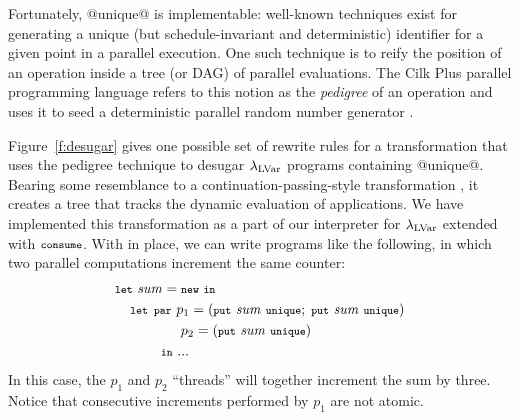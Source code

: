 Fortunately, @unique@ is implementable: well-known techniques exist for generating a unique (but
schedule-invariant and deterministic) identifier for a given point in
a parallel execution.
One such technique is to reify the position of an
operation inside a tree (or DAG) of parallel evaluations.  
The Cilk Plus parallel programming language 
refers to this notion as the {\em pedigree} of an operation and uses it to seed a
deterministic parallel random number generator \cite{cilk-dprng}.

Figure~\ref{f:desugar} gives one possible set of rewrite rules for a transformation that uses the pedigree technique to desugar $\textup{\ensuremath{\lambda_{\textrm{LVar}}}}$ programs containing @unique@.  Bearing some resemblance to a continuation-passing-style transformation \cite{cps-citation}, it 
creates a tree that tracks the dynamic evaluation of
applications.
We have implemented this transformation as a part of our 
interpreter for $\textup{\ensuremath{\lambda_{\textrm{LVar}}}}$ extended with $\mbox{\footnotesize \texttt{consume}}$.
With  in place, we can write programs like the following, in which two
parallel
computations increment the same counter:
\begin{equation*}
\begin{split}
& \letexp{\mathit{sum}}{\NEW}{ \\
& \letspace \LETPAR      ~p_1 = (\putexp{\mathit{sum}}{\impfnt{unique}};\; \putexp{\mathit{sum}}{\impfnt{unique}})\\
& \letspace \letparspace ~p_2 = (\putexp{\mathit{sum}}{\impfnt{unique}})\\
& \letspace \letspace \letspace \IN~ ...
}
\end{split}
\end{equation*}
In this case, the $p_1$ and $p_2$ ``threads'' will together
increment the sum by three.  Notice that consecutive increments
performed by $p_1$ are not atomic.  

